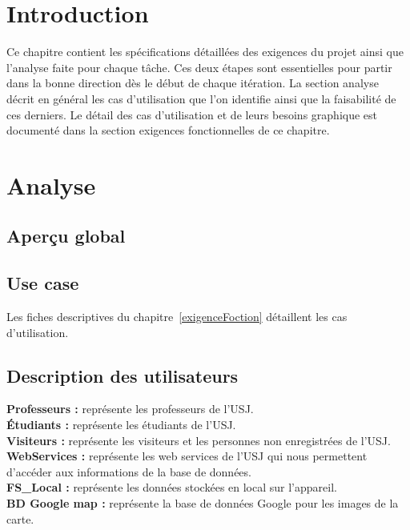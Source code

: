 \section{Introduction}
Ce chapitre contient les spécifications détaillées des exigences du projet ainsi que l'analyse faite pour chaque tâche. Ces deux étapes sont essentielles pour partir dans la bonne direction dès le début de chaque itération.  La section analyse décrit en général les cas d'utilisation que l'on identifie ainsi que la faisabilité de ces derniers. Le détail des cas d'utilisation et de leurs besoins graphique est documenté dans la section exigences fonctionnelles de ce chapitre.
\section{Analyse}
	\subsection{ Aperçu global}
	\subsection{Use case}
	 Les fiches descriptives du chapitre~\ref{exigenceFoction} détaillent les cas d'utilisation.
	\subsection{Description des utilisateurs}
		\textbf{Professeurs :} représente les professeurs de l'USJ.\\[0.2cm]
		\textbf{Étudiants :} représente les étudiants de l'USJ.\\[0.2cm]
		\textbf{Visiteurs :} représente les visiteurs et les personnes non enregistrées de l'USJ.\\[0.2cm]
		\textbf{WebServices :} représente les web services de l'\gls{USJ} qui nous permettent d'accéder aux informations de la base de données.\\[0.2cm]
		\textbf{FS\_Local :} représente les données stockées en local sur l'appareil.\\[0.2cm]
		\textbf{BD Google map :} représente la base de données Google pour les images de la carte.\\[0.2cm]
		
